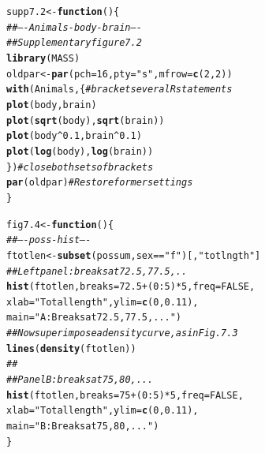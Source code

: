 \documentclass[12pt, a4paper,  BCOR=8.25mm, DIV=15]{scrartcl}\usepackage[]{graphicx}\usepackage[]{color}
\makeatletter
\newcommand{\hlnum}[1]{\textcolor[rgb]{0.686,0.059,0.569}{#1}}%
\newcommand{\hlstr}[1]{\textcolor[rgb]{0.192,0.494,0.8}{#1}}%
\newcommand{\hlcom}[1]{\textcolor[rgb]{0.678,0.584,0.686}{\textit{#1}}}%
\newcommand{\hlopt}[1]{\textcolor[rgb]{0,0,0}{#1}}%
\newcommand{\hlstd}[1]{\textcolor[rgb]{0.345,0.345,0.345}{#1}}%
\newcommand{\hlkwa}[1]{\textcolor[rgb]{0.161,0.373,0.58}{\textbf{#1}}}%
\newcommand{\hlkwb}[1]{\textcolor[rgb]{0.69,0.353,0.396}{#1}}%
\newcommand{\hlkwc}[1]{\textcolor[rgb]{0.333,0.667,0.333}{#1}}%
\newcommand{\hlkwd}[1]{\textcolor[rgb]{0.737,0.353,0.396}{\textbf{#1}}}%
\newenvironment{kframe}{%
 \def\at@end@of@kframe{}%
 \ifinner\ifhmode%
  \def\at@end@of@kframe{\end{minipage}}%
  \begin{minipage}{\columnwidth}%
 \fi\fi%
 \def\FrameCommand##1{\hskip\@totalleftmargin \hskip-\fboxsep
 \colorbox{shadecolor}{##1}\hskip-\fboxsep
     \hskip-\linewidth \hskip-\@totalleftmargin \hskip\columnwidth}%
 \MakeFramed {\advance\hsize-\width
   \@totalleftmargin\z@ \linewidth\hsize
   \@setminipage}}%
 {\par\unskip\endMakeFramed%
 \at@end@of@kframe}
\newenvironment{knitrout}{}{} %
\makeatother
\begin{document}
\begin{knitrout}
\color{fgcolor}\begin{kframe}
\begin{alltt}
\hlstd{supp7.2} \hlkwb{<-} \hlkwa{function}\hlstd{()\{}
\hlcom{## ---- Animals-body-brain ----}
\hlcom{## Supplementary figure 7.2}
\hlkwd{library}\hlstd{(MASS)}
\hlstd{oldpar} \hlkwb{<-} \hlkwd{par}\hlstd{(}\hlkwc{pch}\hlstd{=}\hlnum{16}\hlstd{,} \hlkwc{pty}\hlstd{=}\hlstr{"s"}\hlstd{,} \hlkwc{mfrow}\hlstd{=}\hlkwd{c}\hlstd{(}\hlnum{2}\hlstd{,}\hlnum{2}\hlstd{))}
\hlkwd{with}\hlstd{(Animals, \{}      \hlcom{# bracket several R statements}
  \hlkwd{plot}\hlstd{(body, brain)}
  \hlkwd{plot}\hlstd{(}\hlkwd{sqrt}\hlstd{(body),} \hlkwd{sqrt}\hlstd{(brain))}
  \hlkwd{plot}\hlstd{(body}\hlopt{^}\hlnum{0.1}\hlstd{, brain}\hlopt{^}\hlnum{0.1}\hlstd{)}
  \hlkwd{plot}\hlstd{(}\hlkwd{log}\hlstd{(body),} \hlkwd{log}\hlstd{(brain))}
\hlstd{\})}                   \hlcom{# close both sets of brackets}
\hlkwd{par}\hlstd{(oldpar)}          \hlcom{# Restore former settings}
\hlstd{\}}
\end{alltt}
\end{kframe}
\end{knitrout}

\begin{knitrout}
\color{fgcolor}\begin{kframe}
\begin{alltt}
\hlstd{fig7.4} \hlkwb{<-} \hlkwa{function}\hlstd{()\{}
\hlcom{## ---- poss-hist ----}
\hlstd{ftotlen} \hlkwb{<-} \hlkwd{subset}\hlstd{(possum, sex}\hlopt{==}\hlstr{"f"}\hlstd{)[,} \hlstr{"totlngth"}\hlstd{]}
\hlcom{## Left panel: breaks at 72.5, 77.5,..}
\hlkwd{hist}\hlstd{(ftotlen,} \hlkwc{breaks} \hlstd{=} \hlnum{72.5} \hlopt{+} \hlstd{(}\hlnum{0}\hlopt{:}\hlnum{5}\hlstd{)}\hlopt{*}\hlnum{5}\hlstd{,} \hlkwc{freq}\hlstd{=}\hlnum{FALSE}\hlstd{,}
     \hlkwc{xlab}\hlstd{=}\hlstr{"Total length"}\hlstd{,} \hlkwc{ylim}\hlstd{=}\hlkwd{c}\hlstd{(}\hlnum{0}\hlstd{,}\hlnum{0.11}\hlstd{),}
     \hlkwc{main} \hlstd{=}\hlstr{"A: Breaks at 72.5, 77.5,..."}\hlstd{)}
\hlcom{## Now superimpose a density curve, as in Fig. 7.3}
\hlkwd{lines}\hlstd{(}\hlkwd{density}\hlstd{(ftotlen))}
\hlcom{##}
\hlcom{## Panel B: breaks at 75, 80, ...}
\hlkwd{hist}\hlstd{(ftotlen,} \hlkwc{breaks} \hlstd{=} \hlnum{75} \hlopt{+} \hlstd{(}\hlnum{0}\hlopt{:}\hlnum{5}\hlstd{)}\hlopt{*}\hlnum{5}\hlstd{,} \hlkwc{freq}\hlstd{=}\hlnum{FALSE}\hlstd{,}
     \hlkwc{xlab}\hlstd{=}\hlstr{"Total length"}\hlstd{,} \hlkwc{ylim}\hlstd{=}\hlkwd{c}\hlstd{(}\hlnum{0}\hlstd{,}\hlnum{0.11}\hlstd{),}
     \hlkwc{main}\hlstd{=}\hlstr{"B: Breaks at 75, 80, ..."}\hlstd{)}
\hlstd{\}}
\end{alltt}
\end{kframe}
\end{knitrout}
\end{document}
